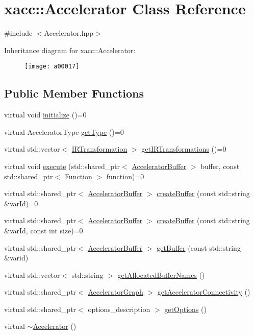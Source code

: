 \hypertarget{a00017}{}\section{xacc\+:\+:Accelerator Class Reference}
\label{a00017}


{\ttfamily \#include $<$Accelerator.\+hpp$>$}

Inheritance diagram for xacc\+:\+:Accelerator\+:\begin{figure}[H]
\begin{center}
\leavevmode
\texttt{[image: a00017]}
\end{center}
\end{figure}
\subsection*{Public Member Functions}
\begin{DoxyCompactItemize}
\item 
virtual void \hyperlink{a00017_a8cdc6f0c5a660013c29c07657a06303b}{initialize} ()=0
\item 
virtual Accelerator\+Type \hyperlink{a00017_aaffc3e4bb9880eb5041b1b58ee4c2665}{get\+Type} ()=0
\item 
virtual std\+::vector$<$ \hyperlink{a00078}{I\+R\+Transformation} $>$ \hyperlink{a00017_ad6e4a642dcb24e552675bcbeff1e1b04}{get\+I\+R\+Transformations} ()=0
\item 
virtual void \hyperlink{a00017_a89b3f3e6294f228abf03a410b0fb1674}{execute} (std\+::shared\+\_\+ptr$<$ \hyperlink{a00019}{Accelerator\+Buffer} $>$ buffer, const std\+::shared\+\_\+ptr$<$ \hyperlink{a00059}{Function} $>$ function)=0
\item 
virtual std\+::shared\+\_\+ptr$<$ \hyperlink{a00019}{Accelerator\+Buffer} $>$ \hyperlink{a00017_aab5046e8d83ab390302e0f49533e95fc}{create\+Buffer} (const std\+::string \&var\+Id)=0
\item 
virtual std\+::shared\+\_\+ptr$<$ \hyperlink{a00019}{Accelerator\+Buffer} $>$ \hyperlink{a00017_a064a2dbd58338364115c260267806945}{create\+Buffer} (const std\+::string \&var\+Id, const int size)=0
\item 
virtual std\+::shared\+\_\+ptr$<$ \hyperlink{a00019}{Accelerator\+Buffer} $>$ \hyperlink{a00017_ab3820be326e28a553fed1a824f4d41d0}{get\+Buffer} (const std\+::string \&varid)
\item 
virtual std\+::vector$<$ std\+::string $>$ \hyperlink{a00017_ae1463d7e405df89fa4af47e8922f4b82}{get\+Allocated\+Buffer\+Names} ()
\item 
virtual std\+::shared\+\_\+ptr$<$ \hyperlink{a00064}{Accelerator\+Graph} $>$ \hyperlink{a00017_adfed940ce1fa476b009344ddf5a4bbc3}{get\+Accelerator\+Connectivity} ()
\item 
virtual std\+::shared\+\_\+ptr$<$ options\+\_\+description $>$ \hyperlink{a00017_a98c9eda6b54367c75667ecfbbf167979}{get\+Options} ()
\item 
virtual \hyperlink{a00017_aed88ab0d71b765f0b0f512684ccd4b55}{$\sim$\+Accelerator} ()
\end{DoxyCompactItemize}
